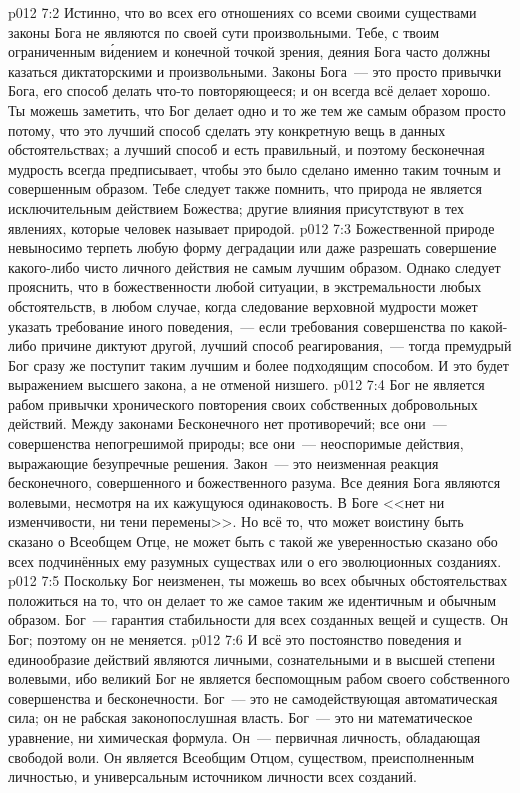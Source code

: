 \vs p012 7:2 \pc Истинно, что во всех его отношениях со всеми своими существами законы Бога не являются по своей сути произвольными. Тебе, с твоим ограниченным в\'идением и конечной точкой зрения, деяния Бога часто должны казаться диктаторскими и произвольными. Законы Бога~--- это просто привычки Бога, его способ делать что-то повторяющееся; и он всегда всё делает хорошо. Ты можешь заметить, что Бог делает одно и то же тем же самым образом просто потому, что это лучший способ сделать эту конкретную вещь в данных обстоятельствах; а лучший способ и есть правильный, и поэтому бесконечная мудрость всегда предписывает, чтобы это было сделано именно таким точным и совершенным образом. Тебе следует также помнить, что природа не является исключительным действием Божества; другие влияния присутствуют в тех явлениях, которые человек называет природой.
\vs p012 7:3 Божественной природе невыносимо терпеть любую форму деградации или даже разрешать совершение какого\hyp{}либо чисто личного действия не самым лучшим образом. Однако следует прояснить, что  в божественности любой ситуации, в экстремальности любых обстоятельств, в любом случае, когда следование верховной мудрости может указать требование иного поведения,~--- если требования совершенства по какой\hyp{}либо причине диктуют другой, лучший способ реагирования,~--- тогда премудрый Бог сразу же поступит таким лучшим и более подходящим способом. И это будет выражением высшего закона, а не отменой низшего.
\vs p012 7:4 Бог не является рабом привычки хронического повторения своих собственных добровольных действий. Между законами Бесконечного нет противоречий; все они~--- совершенства непогрешимой природы; все они~--- неоспоримые действия, выражающие безупречные решения. Закон~--- это неизменная реакция бесконечного, совершенного и божественного разума. Все деяния Бога являются волевыми, несмотря на их кажущуюся одинаковость. В Боге <<нет ни изменчивости, ни тени перемены>>. Но всё то, что может воистину быть сказано о Всеобщем Отце, не может быть с такой же уверенностью сказано обо всех подчинённых ему разумных существах или о его эволюционных созданиях.
\vs p012 7:5 Поскольку Бог неизменен, ты можешь во всех обычных обстоятельствах положиться на то, что он делает то же самое таким же идентичным и обычным образом. Бог~--- гарантия стабильности для всех созданных вещей и существ. Он Бог; поэтому он не меняется.
\vs p012 7:6 И всё это постоянство поведения и единообразие действий являются личными, сознательными и в высшей степени волевыми, ибо великий Бог не является беспомощным рабом своего собственного совершенства и бесконечности. Бог~--- это не самодействующая автоматическая сила; он не рабская законопослушная власть. Бог~--- это ни математическое уравнение, ни химическая формула. Он~--- первичная личность, обладающая свободой воли. Он является Всеобщим Отцом, существом, преисполненным личностью, и универсальным источником личности всех созданий.
